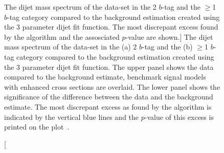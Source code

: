 \begin{figure}[!htb]
  \begin{center}
    \captionsetup[subfigure]{aboveskip=0pt,justification=centering}
  \end{center}
  \vspace{-1em}
  \caption
      [The dijet mass spectrum of the \summer{} data-set in the 2 $b$-tag and the $\geq$1 $b$-tag category
        compared to the background estimation created using the 3 parameter dijet fit function.
        The most discrepant excess found by the \bh{} algorithm and the assosciated \mbox{$p$-value} are shown.]        
      {The dijet mass spectrum of the  \summer{} data-set in the (a) 2 $b$-tag and the (b) $\geq$1 $b$-tag category
        compared to the background estimation created using the 3 parameter dijet fit function.
        The upper panel shows the data compared to the background estimate,
        benchmark signal models with enhanced cross sections are overlaid.
        The lower panel shows the significance of the difference between the data and the background estimate.
        The most discrepant excess as found by the \bh{} algorithm is indicated by the vertical blue lines and the \mbox{$p$-value} of this excess is printed on the plot~\cite{dibjet-ichep_conf}.
          }
  \label{fig:bkg-summer_searchPhase}
\end{figure}

